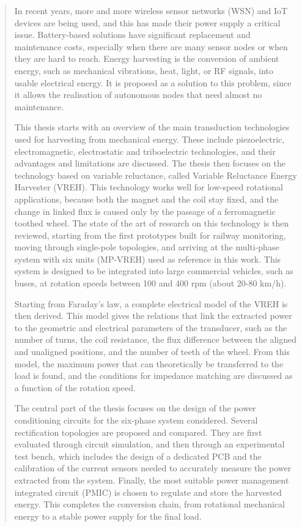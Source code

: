 
\begin{abstract}

In recent years, more and more wireless sensor networks (WSN) and IoT devices are being used, and this has made their power supply a critical issue. Battery-based solutions have significant replacement and maintenance costs, especially when there are many sensor nodes or when they are hard to reach. Energy harvesting is the conversion of ambient energy, such as mechanical vibrations, heat, light, or RF signals, into usable electrical energy. It is proposed as a solution to this problem, since it allows the realisation of autonomous nodes that need almost no maintenance.

This thesis starts with an overview of the main transduction technologies used for harvesting from mechanical energy. These include piezoelectric, electromagnetic, electrostatic and triboelectric technologies, and their advantages and limitations are discussed. The thesis then focuses on the technology based on variable reluctance, called Variable Reluctance Energy Harvester (VREH). This technology works well for low-speed rotational applications, because both the magnet and the coil stay fixed, and the change in linked flux is caused only by the passage of a ferromagnetic toothed wheel. The state of the art of research on this technology is then reviewed, starting from the first prototypes built for railway monitoring, moving through single-pole topologies, and arriving at the multi-phase system with six units (MP-VREH) used as reference in this work. This system is designed to be integrated into large commercial vehicles, such as buses, at rotation speeds between 100 and 400 rpm (about 20-80 km/h).

Starting from Faraday's law, a complete electrical model of the VREH is then derived. This model gives the relations that link the extracted power to the geometric and electrical parameters of the transducer, such as the number of turns, the coil resistance, the flux difference between the aligned and unaligned positions, and the number of teeth of the wheel. From this model, the maximum power that can theoretically be transferred to the load is found, and the conditions for impedance matching are discussed as a function of the rotation speed.

The central part of the thesis focuses on the design of the power conditioning circuits for the six-phase system considered. Several rectification topologies are proposed and compared. They are first evaluated through circuit simulation, and then through an experimental test bench, which includes the design of a dedicated PCB and the calibration of the current sensors needed to accurately measure the power extracted from the system. Finally, the most suitable power management integrated circuit (PMIC) is chosen to regulate and store the harvested energy. This completes the conversion chain, from rotational mechanical energy to a stable power supply for the final load.

\end{abstract}
